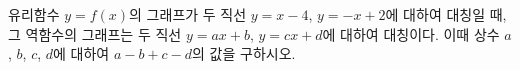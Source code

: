 유리함수 $y=f(x)$의 그래프가 두 직선 $y=x-4$, $y=-x+2$에 대하여 대칭일 때, 그 역함수의 그래프는 두 직선 $y=ax+b$, $y=cx+d$에 대하여 대칭이다. 이때 상수 $a$, $b$, $c$, $d$에 대하여 $a-b+c-d$의 값을 구하시오.
